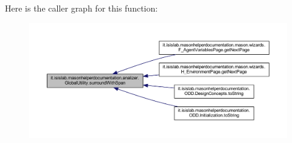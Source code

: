 Here is the caller graph for this function\-:
\nopagebreak
\begin{figure}[H]
\begin{center}
\leavevmode
\includegraphics[width=350pt]{classit_1_1isislab_1_1masonhelperdocumentation_1_1analizer_1_1_global_utility_a38ddfbe46096d9a315a9b2e5aba82569_icgraph}
\end{center}
\end{figure}




